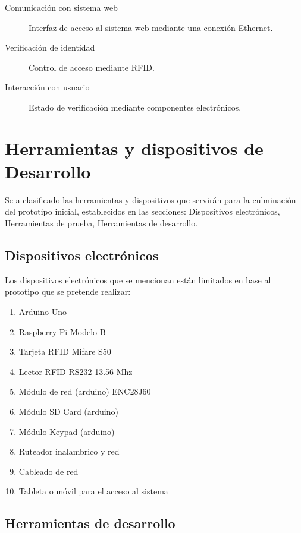 \documentclass[11pt,twocolumn]{article}
\begin{document}
	 \begin{description}
		 \item[Comunicaci\'on con sistema web] Interfaz de acceso al sistema web 
		 mediante una conexi\'on Ethernet.
		 \item[Verificaci\'on de identidad] Control de acceso mediante RFID.
		 \item[Interacci\'on con usuario] Estado de verificaci\'on mediante 
		 componentes electr\'onicos.
	 \end{description}			

\section{Herramientas y dispositivos de Desarrollo}

Se a clasificado las herramientas y dispositivos que servir\'an para la 
culminaci\'on del prototipo inicial, establecidos en las secciones: Dispositivos 
electr\'onicos, Herramientas de prueba, Herramientas de desarrollo.

	\subsection{Dispositivos electr\'onicos }

	Los  dispositivos electr\'onicos que se mencionan est\'an limitados en base 
	al prototipo que se pretende realizar:\\
	
	\begin{enumerate}
		\item Arduino Uno
		\item Raspberry Pi Modelo B
		\item Tarjeta RFID Mifare S50
		\item Lector RFID RS232 13.56 Mhz
		\item M\'odulo de red (arduino) ENC28J60
		\item M\'odulo SD Card (arduino)
		\item M\'odulo Keypad (arduino)
		\item Ruteador inalambrico y red
		\item Cableado de red 
		\item Tableta o m\'ovil para el acceso al sistema
	\end{enumerate}
	
	\subsection{Herramientas de desarrollo}
	
\end{document}
